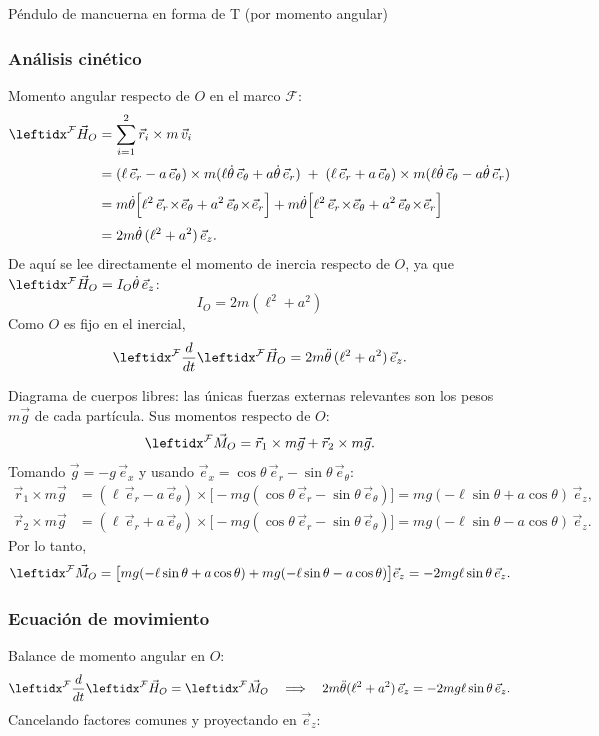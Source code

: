 \begin{solucion}{Péndulo de mancuerna en forma de T (por momento angular)}
\subsubsection*{Análisis cinético}
Momento angular respecto de $O$ en el marco $\mathcal{F}$:
$$\begin{aligned}
\marc{\vec{H}_O}{F}{}
&= \sum_{i=1}^{2} \vec{r}_i \times m\,\vec{v}_i \\[1mm]
&= (\ell\,\vec{e}_r - a\,\vec{e}_\theta)\times m(\ell\dot\theta\,\vec{e}_\theta + a\dot\theta\,\vec{e}_r)
 \;+\; (\ell\,\vec{e}_r + a\,\vec{e}_\theta)\times m(\ell\dot\theta\,\vec{e}_\theta - a\dot\theta\,\vec{e}_r)\\[1mm]
&= m\dot\theta\Big[\ell^2\,\vec{e}_r\!\times\!\vec{e}_\theta + a^2\,\vec{e}_\theta\!\times\!\vec{e}_r\Big]
 + m\dot\theta\Big[\ell^2\,\vec{e}_r\!\times\!\vec{e}_\theta + a^2\,\vec{e}_\theta\!\times\!\vec{e}_r\Big] \\[1mm]
&= 2m\dot\theta\,(\ell^2+a^2)\,\vec{e}_z .
\end{aligned}$$
De aquí se lee directamente el momento de inercia respecto de $O$, ya que $\marc{\vec{H}_O}{F}{}=I_O\dot\theta\,\vec{e}_z$:
$$I_O = 2m(\ell^2+a^2)$$
Como $O$ es fijo en el inercial,
$$\der{\marc{\vec{H}_O}{F}{}}{F}{} = 2m\ddot\theta\,(\ell^2+a^2)\,\vec{e}_z.$$

Diagrama de cuerpos libres: las únicas fuerzas externas relevantes son los pesos $m\vec{g}$ de cada partícula. Sus momentos respecto de $O$:
$$\marc{\vec{M}_O}{F}{} = \vec{r}_1\times m\vec{g} + \vec{r}_2\times m\vec{g}.$$
Tomando $\vec{g} = -g\,\vec{e}_x$ y usando $\vec{e}_x=\cos\theta\,\vec{e}_r-\sin\theta\,\vec{e}_\theta$:
$$\begin{aligned}
\vec{r}_1\times m\vec{g}
&= (\ell\,\vec{e}_r - a\,\vec{e}_\theta)\times\big[-mg(\cos\theta\,\vec{e}_r-\sin\theta\,\vec{e}_\theta)\big]
= mg(-\ell\sin\theta + a\cos\theta)\,\vec{e}_z,\\[1mm]
\vec{r}_2\times m\vec{g}
&= (\ell\,\vec{e}_r + a\,\vec{e}_\theta)\times\big[-mg(\cos\theta\,\vec{e}_r-\sin\theta\,\vec{e}_\theta)\big]
= mg(-\ell\sin\theta - a\cos\theta)\,\vec{e}_z.
\end{aligned}$$
Por lo tanto,
$$\marc{\vec{M}_O}{F}{}
= \big[mg(-\ell\sin\theta + a\cos\theta) + mg(-\ell\sin\theta - a\cos\theta)\big]\vec{e}_z
= -2mg\ell\sin\theta\,\vec{e}_z .$$

\subsubsection*{Ecuación de movimiento}
Balance de momento angular en $O$:
$$\der{\marc{\vec{H}_O}{F}{}}{F}{} = \marc{\vec{M}_O}{F}{}
\quad\Longrightarrow\quad
2m\ddot\theta(\ell^2+a^2)\,\vec{e}_z = -2mg\ell\sin\theta\,\vec{e}_z.$$
Cancelando factores comunes y proyectando en $\vec{e}_z$:


\end{solucion}
